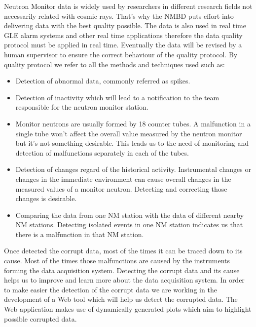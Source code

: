 \documentclass[a4paper]{jpconf}
\begin{document}
Neutron Monitor data is widely used by researchers in different research fields not necessarily related with cosmic rays. That's why the NMBD
puts effort into delivering data with the best quality possible. The data is also used in real time GLE alarm systems and other real time
applications therefore the data quality protocol must be applied in real time. Eventually the data will be revised by a human supervisor to 
ensure the correct behaviour of the quality protocol. By quality protocol we refer to all the methods and techniques used such as:
\begin{itemize}
	\item   Detection of abnormal data, commonly referred as spikes.
	\item   Detection of inactivity which will lead to a notification to the team responsible for the neutron monitor station.
	\item   Monitor neutrons are usually formed by 18 counter tubes. A malfunction in a single tube won't affect the overall value measured
	  	by the neutron monitor but it's not something desirable. This leads us to the need of monitoring and detection of malfunctions
		separately in each of the tubes.  
	\item	Detection of changes regard of the historical activity. Instrumental changes or changes in the immediate environment can cause 
	  	overall changes in the measured values of a monitor neutron. Detecting and correcting those changes is desirable.
	\item 	Comparing the data from one NM station with the data of different nearby NM stations. Detecting isolated events in one NM
	  	station indicates us that there is a malfunction in that NM station.	
\end{itemize}
Once detected the corrupt data, most of the times it can be traced down to its cause. Most of the times those malfunctions are caused by the
instruments forming the data acquisition system. Detecting the corrupt data and its cause helps us to improve and learn more about the data
acquisition system. In order to make easier the detection of the corrupt data we are working in the development of a Web tool which will help
us detect the corrupted data. The Web application makes use of dynamically generated plots which aim to highlight possible corrupted data.
\end{document}
